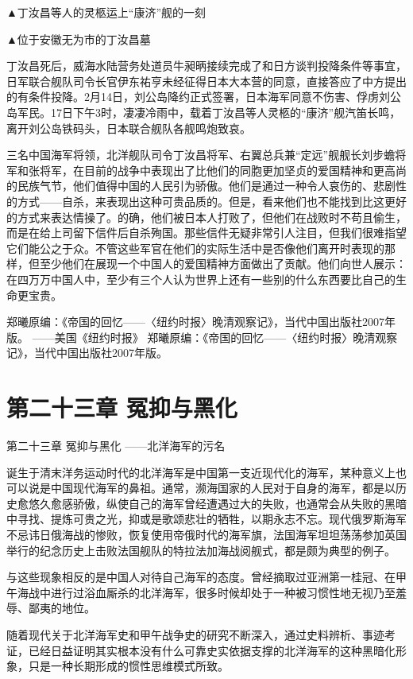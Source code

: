 \documentclass[12pt,UTF8]{ctexbook}
\begin{document}
▲丁汝昌等人的灵柩运上“康济”舰的一刻


▲位于安徽无为市的丁汝昌墓

丁汝昌死后，威海水陆营务处道员牛昶昞接续完成了和日方谈判投降条件等事宜，日军联合舰队司令长官伊东祐亨未经征得日本大本营的同意，直接答应了中方提出的有条件投降。2月14日，刘公岛降约正式签署，日本海军同意不伤害、俘虏刘公岛军民。17日下午3时，凄凄冷雨中，载着丁汝昌等人灵柩的“康济”舰汽笛长鸣，离开刘公岛铁码头，日本联合舰队各舰鸣炮致哀。

三名中国海军将领，北洋舰队司令丁汝昌将军、右翼总兵兼“定远”舰舰长刘步蟾将军和张将军，在目前的战争中表现出了比他们的同胞更加坚贞的爱国精神和更高尚的民族气节，他们值得中国的人民引为骄傲。他们是通过一种令人哀伤的、悲剧性的方式——自杀，来表现出这种可贵品质的。但是，看来他们也不能找到比这更好的方式来表达情操了。的确，他们被日本人打败了，但他们在战败时不苟且偷生，而是在给上司留下信件后自杀殉国。那些信件无疑非常引人注目，但我们很难指望它们能公之于众。不管这些军官在他们的实际生活中是否像他们离开时表现的那样，但至少他们在展现一个中国人的爱国精神方面做出了贡献。他们向世人展示：在四万万中国人中，至少有三个人认为世界上还有一些别的什么东西要比自己的生命更宝贵。

郑曦原编：《帝国的回忆——〈纽约时报〉晚清观察记》，当代中国出版社2007年版。
——美国《纽约时报》 郑曦原编：《帝国的回忆——〈纽约时报〉晚清观察记》，当代中国出版社2007年版。

\chapter{第二十三章 冤抑与黑化}

第二十三章
冤抑与黑化
——北洋海军的污名

诞生于清末洋务运动时代的北洋海军是中国第一支近现代化的海军，某种意义上也可以说是中国现代海军的鼻祖。通常，濒海国家的人民对于自身的海军，都是以历史愈悠久愈感骄傲，纵使自己的海军曾经遭遇过大的失败，也通常会从失败的黑暗中寻找、提炼可贵之光，抑或是歌颂悲壮的牺牲，以期永志不忘。现代俄罗斯海军不忌讳日俄海战的惨败，恢复使用帝俄时代的海军旗，法国海军坦坦荡荡参加英国举行的纪念历史上击败法国舰队的特拉法加海战阅舰式，都是颇为典型的例子。

与这些现象相反的是中国人对待自己海军的态度。曾经摘取过亚洲第一桂冠、在甲午海战中进行过浴血厮杀的北洋海军，很多时候却处于一种被习惯性地无视乃至羞辱、鄙夷的地位。

随着现代关于北洋海军史和甲午战争史的研究不断深入，通过史料辨析、事迹考证，已经日益证明其实根本没有什么可靠史实依据支撑的北洋海军的这种黑暗化形象，只是一种长期形成的惯性思维模式所致。
\end{document}
